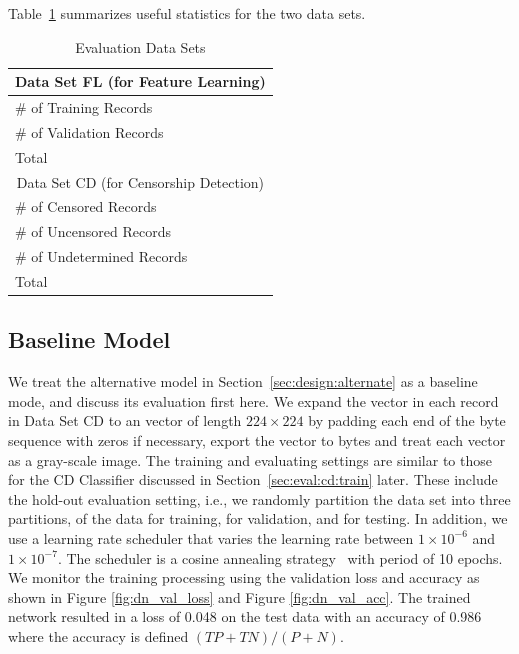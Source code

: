Table~\ref{tab:data} summarizes useful statistics for the two data sets. 
\begin{table}[!htbp]
	\centering
	\caption{Evaluation Data Sets}
	\label{tab:data}

	\begin{tabular}{p{} r}
		\toprule
		\multicolumn{2}{c}{Data Set FL (for Feature Learning)} \\
		\midrule
		\# of Training Records & \FLntrain \\
		\# of Validation Records & \FLnvalid \\
		Total  & \FLnrecords \\
		\midrule
		\multicolumn{2}{c}{Data Set CD (for Censorship Detection)} \\
		\midrule
		\# of Censored Records & \CDncensored \\
		\# of Uncensored Records & \CDnuncensored \\
		\# of Undetermined Records & \CDnunknown \\
		Total & \CDnrecords \\
		\bottomrule
	\end{tabular}
\end{table}

\subsection{Baseline Model}
\label{sec:eval:dense}
We treat the alternative model in Section~\ref{sec:design:alternate} as 
a baseline mode, and discuss its evaluation first here. 
We expand the vector in each record in Data Set CD to an vector of length $224
\times 224$ by padding each end
of the byte sequence with zeros if necessary, export the vector to bytes
and treat each vector as a gray-scale image. 
The training and evaluating settings are similar to those for the 
CD Classifier discussed in Section~\ref{sec:eval:cd:train} later.  
These include the hold-out evaluation setting, i.e., we randomly partition
the data set into three partitions, \CDtrainratio of the data for training,
\CDvalidratio for validation, and \CDtestratio for testing. In addition, we use a learning
rate scheduler that varies the learning rate between $1 \times 10^{-6}$ and $1
\times 10^{-7}$. The scheduler is  a cosine annealing 
strategy~\cite{loshchilov10sgdr} with period of
10 epochs. We monitor the training processing using the validation loss and
accuracy as shown in
Figure \ref{fig:dn_val_loss} and Figure \ref{fig:dn_val_acc}. The trained
network resulted in a loss of 0.048 on the test data with an accuracy of 0.986
where the accuracy is defined $(TP + TN)/(P + N)$.

